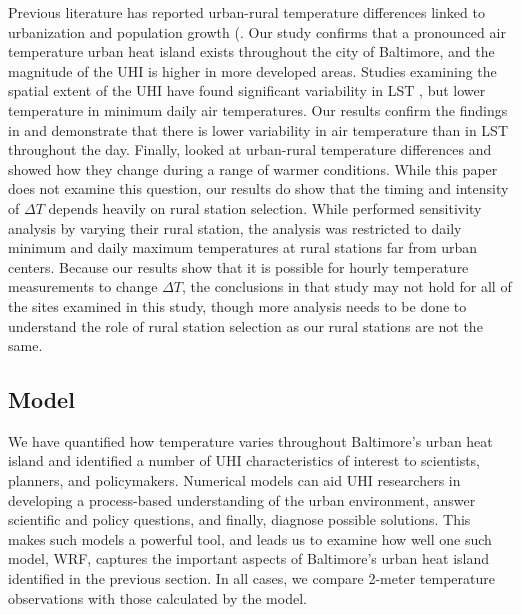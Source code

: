 Previous literature has reported urban-rural temperature differences linked to urbanization and population growth (\cite{Huang20111753,Boug10}. Our study confirms that a pronounced air temperature urban heat island exists throughout the city of Baltimore, and the magnitude of the UHI is higher in more developed areas. Studies examining the spatial extent of the UHI have found significant variability in LST \citep{Huang20111753}, but lower temperature in minimum daily air temperatures. 
Our results confirm the findings in \cite{scott2017intraurban} and demonstrate that there is lower variability in air temperature than in LST throughout the day. Finally, \cite{scott2018reduced} looked at urban-rural temperature differences and showed how they change during a range of warmer conditions. While this paper does not examine this question, our results do show that the timing and intensity of $\Delta T$ depends heavily on rural station selection. While \cite{scott2018reduced} performed sensitivity analysis by varying their rural station, the analysis was restricted to daily minimum and daily maximum temperatures at rural stations far from urban centers. Because our results show that it is possible for hourly temperature measurements to change  
$\Delta T$, the conclusions in that study may not hold for all of the sites examined in this study, though more analysis needs to be done to understand the role of rural station selection as our rural stations are not the same.

\subsection{Model}
We have quantified how temperature varies throughout Baltimore's urban heat island and identified a number of UHI characteristics of interest to scientists, planners, and policymakers.
Numerical models can aid UHI researchers in developing a process-based understanding of the urban environment, answer scientific and policy questions, and finally, diagnose possible solutions. This makes such models a powerful tool, and leads us to examine how well one such model, WRF, captures the important aspects of Baltimore's urban heat island identified in the previous section. 
In all cases, we compare 2-meter temperature observations with those calculated by the model. 

